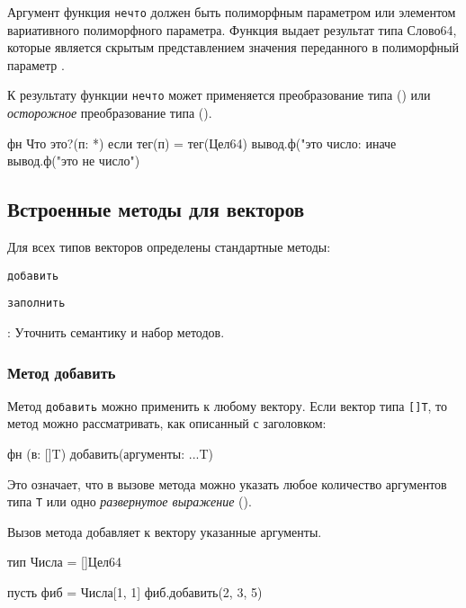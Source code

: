 \bigskip
Аргумент функция \verb+нечто+ должен быть полиморфным параметром или элементом вариативного полиморфного параметра. 
Функция выдает результат типа Слово64, которые является скрытым представлением значения переданного в полиморфный параметр .

К результату функции \verb+нечто+ может применяется преобразование типа () или \emph{осторожное} преобразование типа ().

\begin{Trivil}
фн Что это?(п: *) {
    если тег(п) = тег(Цел64) { 
        вывод.ф("это число: %
    }
    иначе { 
        вывод.ф("это не число") 
    }
}
\end{Trivil}

\hypertarget{stdvector}{%
\subsection{Встроенные методы для векторов}\label{stdfuncs:stdvector}}

Для всех типов векторов определены стандартные методы:
\begin{d_itemize}
\item
    \verb+добавить+
\item
    \verb+заполнить+
\end{d_itemize}

\bigskip
\TBD: Уточнить семантику и набор методов.

\hypertarget{vector-append}{%
\subsubsection{Метод добавить}\label{stdfuncs:vector-append}}

Метод \verb+добавить+ можно применить к любому вектору. Если вектор типа \verb+[]T+, то метод можно рассматривать, как описанный с заголовком:
\begin{Trivil}
фн (в: []T) добавить(аргументы: ...T) 
\end{Trivil}

Это означает, что в вызове метода можно указать любое количество аргументов типа \verb+T+ или одно \emph{развернутое выражение} ().

Вызов метода добавляет к вектору указанные аргументы.

\begin{Trivil}
тип Числа = []Цел64

пусть фиб = Числа[1, 1]
фиб.добавить(2, 3, 5)
\end{Trivil}

